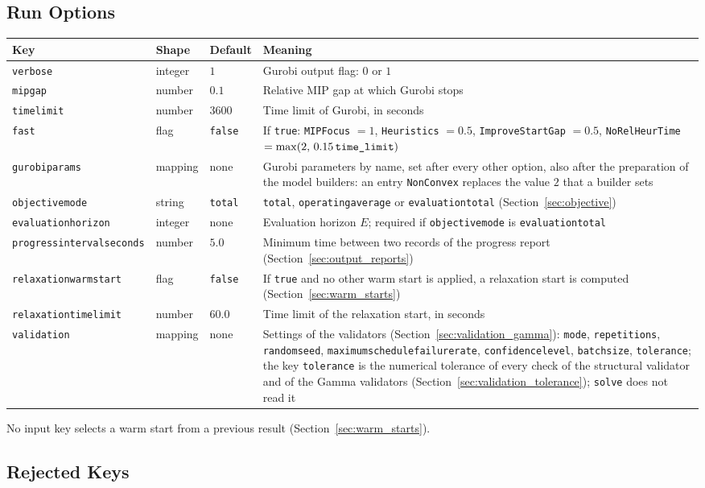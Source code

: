 \documentclass[11pt,a4paper]{article}
\makeatletter
\theoremstyle{plain}
\theoremstyle{definition}
\renewcommand{\_}{\textunderscore\allowbreak{}}
\providecommand{\optrow}[4]{{\raggedright #1\par} & {\raggedright #2\par} & {\raggedright #3\par} & {\raggedright #4\par} \\}
\providecommand{\tabstart}[2]{\begingroup\small\begin{longtable}{@{}#1@{}}\toprule #2 \\ \midrule \endhead}
\providecommand{\tabend}{\bottomrule\end{longtable}\endgroup}
\makeatother
\begin{document}
\subsection{Run Options}\label{sec:run_options}

\tabstart{p{3.3cm}p{1.9cm}p{1.6cm}p{6.0cm}}{Key & Shape & Default & Meaning}
\optrow{\texttt{verbose}}{integer}{$1$}{Gurobi output flag: $0$ or $1$}
\optrow{\texttt{mip\_gap}}{number}{$0.1$}{Relative MIP gap at which Gurobi stops}
\optrow{\texttt{time\_limit}}{number}{$3600$}{Time limit of Gurobi, in seconds}
\optrow{\texttt{fast}}{flag}{\texttt{false}}{If \texttt{true}: \texttt{MIPFocus} $= 1$, \texttt{Heuristics} $= 0.5$, \texttt{ImproveStartGap} $= 0.5$, \texttt{NoRelHeurTime} $= \max(2,\, 0.15\,\texttt{time\_limit})$}
\optrow{\texttt{gurobi\_params}}{mapping}{none}{Gurobi parameters by name, set after every other option, also after the preparation of the model builders: an entry \texttt{NonConvex} replaces the value $2$ that a builder sets}
\optrow{\texttt{objective\_mode}}{string}{\texttt{total}}{\texttt{total}, \texttt{operating\_average} or \texttt{evaluation\_total} (Section~\ref{sec:objective})}
\optrow{\texttt{evaluation\_horizon}}{integer}{none}{Evaluation horizon $E$; required if \texttt{objective\_mode} is \texttt{evaluation\_total}}
\optrow{\texttt{progress\_interval\_seconds}}{number}{$5.0$}{Minimum time between two records of the progress report (Section~\ref{sec:output_reports})}
\optrow{\texttt{relaxation\_warm\_start}}{flag}{\texttt{false}}{If \texttt{true} and no other warm start is applied, a relaxation start is computed (Section~\ref{sec:warm_starts})}
\optrow{\texttt{relaxation\_time\_limit}}{number}{$60.0$}{Time limit of the relaxation start, in seconds}
\optrow{\texttt{validation}}{mapping}{none}{Settings of the validators (Section~\ref{sec:validation_gamma}): \texttt{mode}, \texttt{repetitions}, \texttt{random\_seed}, \texttt{maximum\_schedule\_failure\_rate}, \texttt{confidence\_level}, \texttt{batch\_size}, \texttt{tolerance}; the key \texttt{tolerance} is the numerical tolerance of every check of the structural validator and of the Gamma validators (Section~\ref{sec:validation_tolerance}); \texttt{solve} does not read it}
\tabend

No input key selects a warm start from a previous result (Section~\ref{sec:warm_starts}).

\subsection{Rejected Keys}\label{sec:input_rejected}
\end{document}
